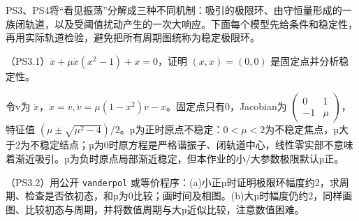 PS3、PS4将“看见振荡”分解成三种不同机制：吸引的极限环、由守恒量形成的一族闭轨道，以及受阈值扰动产生的一次大响应。下面每个模型先给条件和稳定性，再用实际轨道检验，避免把所有周期图统称为稳定极限环。

\begin{exercise}\label{task:chaos-PS3-1}
（PS3.1）$\ddot x+\mu\dot x(x^2-1)+x=0$，证明 $(x,\dot x)=(0,0)$ 是固定点并分析稳定性。
\end{exercise}
\begin{solution}
令v为 $\dot x$，$\dot x=v,\dot v=\mu(1-x^2)v-x$。固定点只有0，Jacobian为 $\left(\begin{smallmatrix}0&1\\-1&\mu\end{smallmatrix}\right)$，特征值 $(\mu\pm\sqrt{\mu^2-4})/2$。µ为正时原点不稳定：$0<\mu<2$为不稳定焦点，µ大于2为不稳定结点；µ为0时原方程是严格谐振子、闭轨道中心，线性零实部不意味着渐近吸引。µ为负时原点局部渐近稳定，但本作业的小/大参数极限默认µ正。
\end{solution}
\begin{exercise}\label{task:chaos-PS3-2}
（PS3.2）用公开 \texttt{vanderpol} 或等价程序：(a)小正µ时证明极限环幅度约2，求周期、检查是否依初态，和µ为0比较；画时间及相图。(b)大µ时幅度仍约2，同样画图、比较初态与周期，并将数值周期与大µ近似比较，注意数值困难。
\end{exercise}
